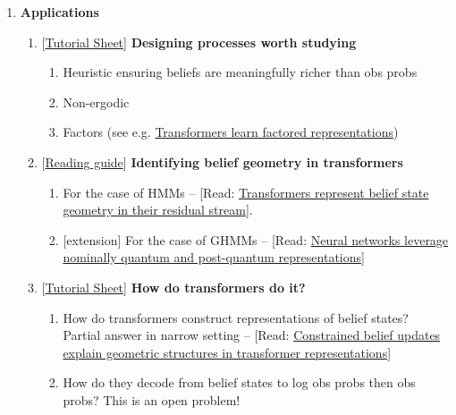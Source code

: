\documentclass[11pt]{article}
\begin{document}
\begin{enumerate}
\begin{enumerate}
\begin{enumerate}
    \item
      Next-token (probability) vectors
    \item
      Mixed-state-presentation (MSP) (see e.g. \href{https://csc.ucdavis.edu/~cmg/papers/msc.pdf}{Mixed States of Hidden Markov Processes and Their Presentations: What and how to calculate})
    \end{enumerate}
  \end{enumerate}
\item
  \textbf{Applications}
  \begin{enumerate}
  \item
    {[}\hyperref[designing-processes]{Tutorial Sheet}{]} \textbf{Designing processes worth studying}
    \begin{enumerate}
    \item
      Heuristic ensuring beliefs are meaningfully richer than obs probs
    \item
      Non-ergodic
    \item
      Factors (see e.g. \href{https://arxiv.org/pdf/2602.02385v1}{Transformers learn factored representations})
    \end{enumerate}
  \item
    {[}\hyperref[belief-geometry]{Reading guide}{]} \textbf{Identifying belief geometry in transformers}
    \begin{enumerate}
    \item
      For the case of HMMs -- {[}Read: \href{https://arxiv.org/pdf/2405.15943}{Transformers represent belief state geometry in their residual stream}{]}.
    \item
      {[}extension{]} For the case of GHMMs -- {[}Read: \href{https://arxiv.org/pdf/2507.07432}{Neural networks leverage nominally quantum and post-quantum representations}{]}
    \end{enumerate}
  \item
    {[}\hyperref[how-transformers-do-it]{Tutorial Sheet}{]} \textbf{How do transformers do it?}
    \begin{enumerate}
    \item
      How do transformers construct representations of belief states? Partial answer in narrow setting -- {[}Read: \href{https://arxiv.org/pdf/2502.01954v2}{Constrained belief updates explain geometric structures in transformer representations}{]}
    \item
      How do they decode from belief states to log obs probs then obs probs? This is an open problem!
    \end{enumerate}
  \end{enumerate}
\end{enumerate}
\end{document}
